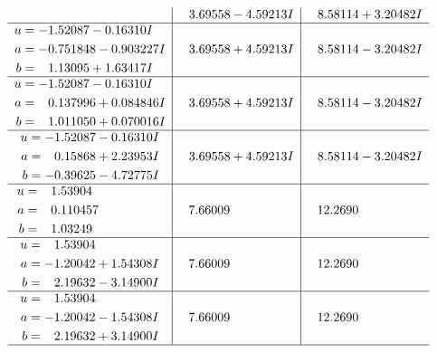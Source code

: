 \documentclass[1p]{elsarticle_modified}
\theoremstyle{definition}
\begin{document}
$$\begin{array}{c|c|c}
 & \phantom{-}3.69558 - 4.59213 I & \phantom{-}8.58114 + 3.20482 I \\ \hline\begin{aligned}
u &= -1.52087 - 0.16310 I \\
a &= -0.751848 - 0.903227 I \\
b &= \phantom{-}1.13095 + 1.63417 I\end{aligned}
 & \phantom{-}3.69558 + 4.59213 I & \phantom{-}8.58114 - 3.20482 I \\ \hline\begin{aligned}
u &= -1.52087 - 0.16310 I \\
a &= \phantom{-}0.137996 + 0.084846 I \\
b &= \phantom{-}1.011050 + 0.070016 I\end{aligned}
 & \phantom{-}3.69558 + 4.59213 I & \phantom{-}8.58114 - 3.20482 I \\ \hline\begin{aligned}
u &= -1.52087 - 0.16310 I \\
a &= \phantom{-}0.15868 + 2.23953 I \\
b &= -0.39625 - 4.72775 I\end{aligned}
 & \phantom{-}3.69558 + 4.59213 I & \phantom{-}8.58114 - 3.20482 I \\ \hline\begin{aligned}
u &= \phantom{-}1.53904\phantom{ +0.000000I} \\
a &= \phantom{-}0.110457\phantom{ +0.000000I} \\
b &= \phantom{-}1.03249\phantom{ +0.000000I}\end{aligned}
 & \phantom{-}7.66009\phantom{ +0.000000I} & \phantom{-}12.2690\phantom{ +0.000000I} \\ \hline\begin{aligned}
u &= \phantom{-}1.53904\phantom{ +0.000000I} \\
a &= -1.20042 + 1.54308 I \\
b &= \phantom{-}2.19632 - 3.14900 I\end{aligned}
 & \phantom{-}7.66009\phantom{ +0.000000I} & \phantom{-}12.2690\phantom{ +0.000000I} \\ \hline\begin{aligned}
u &= \phantom{-}1.53904\phantom{ +0.000000I} \\
a &= -1.20042 - 1.54308 I \\
b &= \phantom{-}2.19632 + 3.14900 I\end{aligned}
 & \phantom{-}7.66009\phantom{ +0.000000I} & \phantom{-}12.2690\phantom{ +0.000000I}\\
 \hline 
 \end{array}$$\newpage\newpage\renewcommand{\arraystretch}{1}
\end{document}
